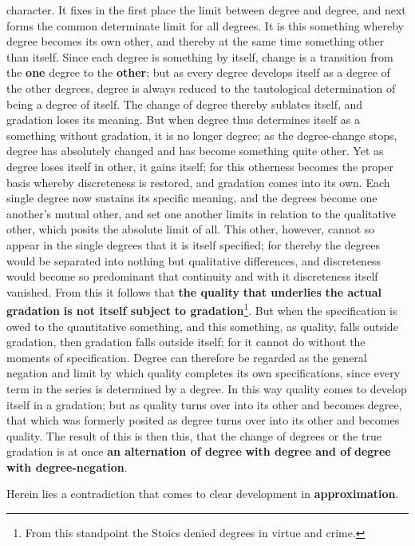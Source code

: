 \documentclass[12pt,a4paper,openany]{book}
\newcommand{\opage}[1]{\marginnote{\footnotesize\textit{[#1]}}}
\begin{document}
\opage{47}character. It fixes in the first place the limit between degree and degree, and next forms the common determinate limit for all degrees. It is this something whereby degree becomes its own other, and thereby at the same time something other than itself. Since each degree is something by itself, change is a transition from the \textbf{one} degree to the \textbf{other}; but as every degree develops itself as a degree of the other degrees, degree is always reduced to the tautological determination of being a degree of itself. The change of degree thereby sublates itself, and gradation loses its meaning. But when degree thus determines itself as a something without gradation, it is no longer degree; as the degree-change stops, degree has absolutely changed and has become something quite other. Yet as degree loses itself in other, it gains itself; for this otherness becomes the proper basis whereby discreteness is restored, and gradation comes into its own. Each single degree now sustains its specific meaning, and the degrees become one another's mutual other, and set one another limits in relation to the qualitative other, which posits the absolute limit of all. This other, however, cannot so appear in the single degrees that it is itself specified; for thereby the degrees would be separated into nothing but qualitative differences, and discreteness would become so predominant that continuity and with it discreteness itself vanished. From this it follows that \textbf{the quality} \textbf{that underlies} \textbf{the actual gradation} \textbf{is not itself subject} \textbf{to gradation}\footnote{From this standpoint the Stoics denied degrees in virtue and crime.}.
\setcounter{footnote}{0}%
\opage{48}But when the specification is owed to the quantitative something, and this something, as quality, falls outside gradation, then gradation falls outside itself; for it cannot do without the moments of specification. Degree can therefore be regarded as the general negation and limit by which quality completes its own specifications, since every term in the series is determined by a degree. In this way quality comes to develop itself in a gradation; but as quality turns over into its other and becomes degree, that which was formerly posited as degree turns over into its other and becomes quality. The result of this is then this, that the change of degrees or the true gradation is at once \textbf{an alternation of degree} \textbf{with degree and of} \textbf{degree with degree-negation}.

Herein lies a contradiction that comes to clear development in \textbf{approximation}.
\end{document}
